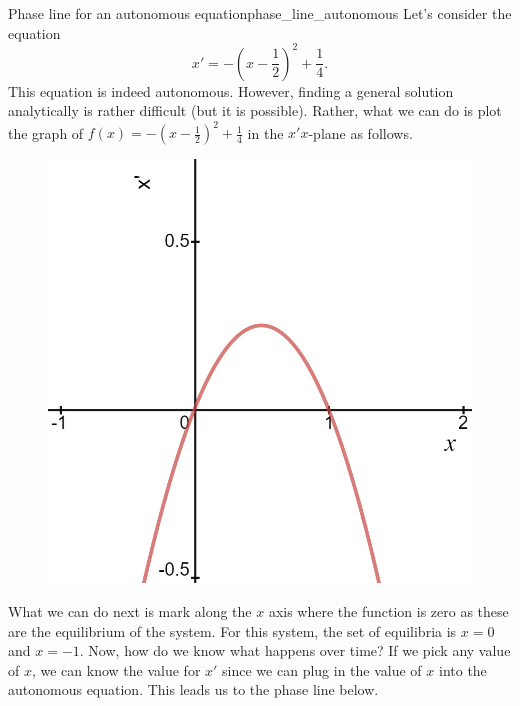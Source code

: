                 \begin{ex}{Phase line for an autonomous equation}{phase_line_autonomous}
                Let's consider the equation
                \[
                x' = -\left(x-\frac{1}{2}\right)^2+\frac{1}{4}.
                \]
                This equation is indeed autonomous. However, finding a general solution analytically is rather difficult (but it is possible).  Rather, what we can do is plot the graph of $f(x)=-\left(x-\frac{1}{2}\right)^2+\frac{1}{4}$ in the $x'x$-plane as follows.
                \begin{figure}[H]
                    \centering
                    \includegraphics[width=.6\textwidth]{Figures_Part_1/for_phase_line.png}
                \end{figure}
                What we can do next is mark along the $x$ axis where the function is zero as these are the equilibrium of the system. For this system, the set of equilibria is $x=0$ and $x=-1$. Now, how do we know what happens over time? If we pick any value of $x$, we can know the value for $x'$ since we can plug in the value of $x$ into the autonomous equation.  This leads us to the phase line below.
                
                \begin{centering}
                \end{centering}
                

\end{ex}
